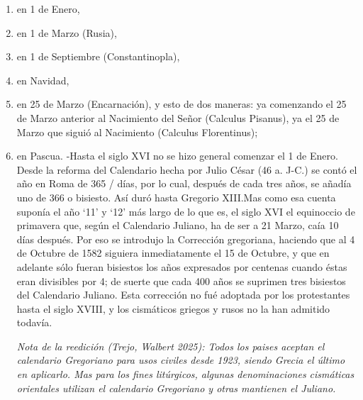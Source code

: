\raggedbottom{} \documentclass[12pt, a4paper, openany]{book} %
\begin{document}
\begin{enumerate}
\begin{enumerate}
\begin{enumerate}
                  \item en 1 de Enero,
                  \item en 1 de Marzo (Rusia),
                  \item en 1 de Septiembre (Constantinopla),
                  \item en Navidad,
                  \item en 25 de Marzo (Encarnación), y esto de dos maneras: ya comenzando el 25 de Marzo anterior al Nacimiento del Señor (Calculus Pisanus), ya el 25 de Marzo que siguió al Nacimiento (Calculus Florentinus);
                  \item en Pascua. -Hasta el siglo XVI no se hizo general comenzar el 1 de Enero. Desde la reforma del Calendario hecha por Julio César (46 a. J-C.) se contó el año en Roma de 365 / días, por lo cual, después de cada tres años, se añadía uno de 366 o bisiesto. Así duró hasta Gregorio XIII.\@ Mas como esa cuenta suponía el año `11' y `12' más largo de lo que es, el siglo XVI el equinoccio de primavera que, según el Calendario Juliano, ha de ser a 21 Marzo, caía 10 días después. Por eso se introdujo la Corrección gregoriana, haciendo que al 4 de Octubre de 1582 siguiera inmediatamente el 15 de Octubre, y que en adelante sólo fueran bisiestos los años expresados por centenas cuando éstas eran divisibles por 4; de suerte que cada 400 años se suprimen tres bisiestos del Calendario Juliano. Esta corrección no fué adoptada por los protestantes hasta el siglo XVIII, y los cismáticos griegos y rusos no la han admitido todavía.

                        \textit{Nota de la reedición (Trejo, Walbert 2025): Todos los paises aceptan el calendario Gregoriano para usos civiles desde 1923, siendo Grecia el último en aplicarlo. Mas para los fines litúrgicos, algunas denominaciones cismáticas orientales utilizan el calendario Gregoriano y otras mantienen el Juliano.}
                \end{enumerate}
        \end{enumerate}
\end{enumerate}
\end{document}
